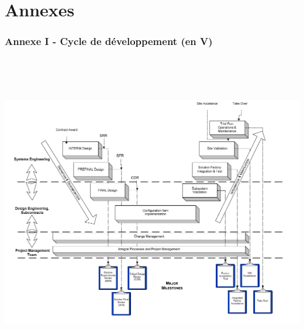 \chapter*{Annexes}

\subsection*{Annexe I - Cycle de développement (en V) }

\includegraphics[height=14cm]{ressources/images/annexes/Vcycle.png}
